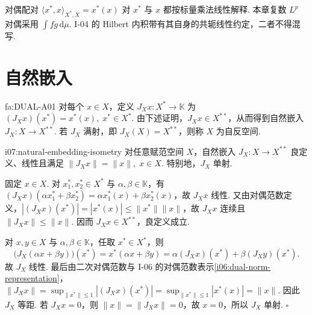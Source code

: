 \begin{FARemark}[Banach配对与Hilbert内积]
对偶配对 \(\displaystyle \langle x^*,x\rangle_{X^*,X}=x^*(x)\) 对 \(\displaystyle x^*\) 与 \(\displaystyle x\) 都按标量乘法线性解释. 本章复数 \(\displaystyle L^p\) 对偶采用 \(\displaystyle \int fg\,\mathrm{d}\mu\). I-04 的 Hilbert 内积带有其自身的共轭线性约定，二者不得混写.
\end{FARemark}

\section{自然嵌入}\label{sec:i07-natural-embedding}

\begin{FADefinition}[A][二次对偶自然嵌入与自反性]{fa:DUAL-A01}
对每个 \(\displaystyle x\in X\)，定义 \(\displaystyle J_Xx:X^*\to\mathbb K\) 为 \(\displaystyle (J_Xx)(x^*)=x^*(x), \; x^*\in X^*\).
由下述证明，\(\displaystyle J_Xx\in X^{**}\)，从而得到自然嵌入 \(\displaystyle J_X:X\to X^{**}\).
若 \(\displaystyle J_X\) 满射，即 \(\displaystyle J_X(X)=X^{**}\)，则称 \(\displaystyle X\) 为自反空间.
\end{FADefinition}

\begin{FAProposition}{i07:natural-embedding-isometry}
对任意赋范空间 \(\displaystyle X\)，自然嵌入 \(\displaystyle J_X:X\to X^{**}\) 良定义、线性且满足 \(\displaystyle \|J_Xx\|=\|x\|, \; x\in X\).
特别地，\(\displaystyle J_X\) 单射.
\end{FAProposition}

\begin{FAProof}
固定 \(\displaystyle x\in X\). 对 \(\displaystyle x_1^*,x_2^*\in X^*\) 与 \(\displaystyle \alpha,\beta\in\mathbb K\)，有 \(\displaystyle (J_Xx)(\alpha x_1^*+\beta x_2^*)=\alpha x_1^*(x)+\beta x_2^*(x)\)，故 \(\displaystyle J_Xx\) 线性. 又由对偶范数定义，\(\displaystyle |(J_Xx)(x^*)|=|x^*(x)|\leqslant\|x^*\|\|x\|\)，故 \(\displaystyle J_Xx\) 连续且 \(\displaystyle \|J_Xx\|\leqslant\|x\|\). 因而 \(\displaystyle J_Xx\in X^{**}\)，良定义成立.

对 \(\displaystyle x,y\in X\) 与 \(\displaystyle \alpha,\beta\in\mathbb K\)，任取 \(\displaystyle x^*\in X^*\)，则
\[
\bigl(J_X(\alpha x+\beta y)\bigr)(x^*)
=x^*(\alpha x+\beta y)
=\alpha(J_Xx)(x^*)+\beta(J_Xy)(x^*).
\]
故 \(\displaystyle J_X\) 线性. 最后由二次对偶范数与 I-06 的对偶范数表示\autoref{i06:dual-norm-representation}， \(\displaystyle \|J_Xx\| =\sup_{\|x^*\|\leqslant1}|(J_Xx)(x^*)| =\sup_{\|x^*\|\leqslant1}|x^*(x)| =\|x\|\).
因此 \(\displaystyle J_X\) 等距. 若 \(\displaystyle J_Xx=0\)，则 \(\displaystyle \|x\|=\|J_Xx\|=0\)，故 \(\displaystyle x=0\)，所以 \(\displaystyle J_X\) 单射.
\hfill\(\square\)
\end{FAProof}

